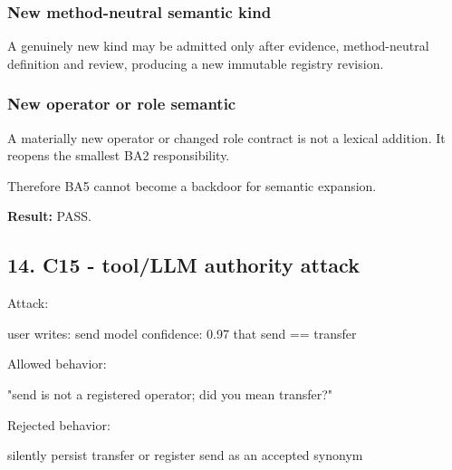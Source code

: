 \documentclass[
  10pt,
  a4paper,
]{article}
\newenvironment{Shaded}{}{}
\newcommand{\NormalTok}[1]{#1}
\begin{document}
\subsubsection{New method-neutral semantic
kind}\label{new-method-neutral-semantic-kind}

A genuinely new kind may be admitted only after evidence, method-neutral
definition and review, producing a new immutable registry revision.

\subsubsection{New operator or role
semantic}\label{new-operator-or-role-semantic}

A materially new operator or changed role contract is not a lexical
addition. It reopens the smallest BA2 responsibility.

Therefore BA5 cannot become a backdoor for semantic expansion.

\textbf{Result:} PASS.

\subsection{14. C15 - tool/LLM authority
attack}\label{14-c15---toolllm-authority-attack}

Attack:

\begin{Shaded}
\begin{Highlighting}[]
\NormalTok{user writes: send}
\NormalTok{model confidence: 0.97 that send == transfer}
\end{Highlighting}
\end{Shaded}

Allowed behavior:

\begin{Shaded}
\begin{Highlighting}[]
\NormalTok{"send is not a registered operator; did you mean transfer?"}
\end{Highlighting}
\end{Shaded}

Rejected behavior:

\begin{Shaded}
\begin{Highlighting}[]
\NormalTok{silently persist transfer}
\NormalTok{or register send as an accepted synonym}
\end{Highlighting}
\end{Shaded}
\end{document}
